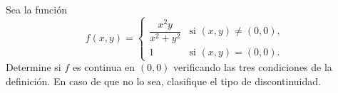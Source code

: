 Sea la función
\[
f(x,y) =
\begin{cases}
    \dfrac{x^2 y}{x^2 + y^2} & \text{si } (x,y) \neq (0,0), \\[6pt]
    1 & \text{si } (x,y) = (0,0).
\end{cases}
\]
Determine si $f$ es continua en $(0,0)$ verificando las tres condiciones de la definición. En caso de que no lo sea, clasifique el tipo de discontinuidad.
